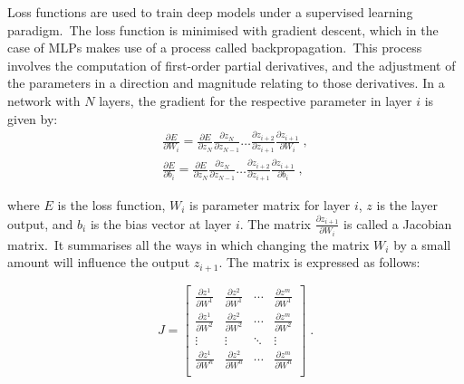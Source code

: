 \noindent Loss functions are used to train deep models under a supervised learning paradigm.\ The loss function is minimised with gradient descent, which in the case of MLPs makes use of a process called backpropagation.\ This process involves the computation of first-order partial derivatives, and the adjustment of the parameters in a direction and magnitude relating to those derivatives. In a network with $ N $ layers, the gradient for the respective parameter in layer $ i $ is given by:
\begin{subequations}
	\begin{gather}
		\frac{\partial E} {\partial W_i} = \frac{\partial E} {\partial z_N}\frac{\partial z_N} {\partial z_{N - 1}}  \dots \frac{\partial z_{i + 2}} {\partial z_{i + 1}}\frac{\partial z_{i + 1}} {\partial W_{i}} \; , \\
		\frac{\partial E} {\partial b_i} = \frac{\partial E} {\partial z_N}\frac{\partial z_N} {\partial z_{N - 1}}  \dots \frac{\partial z_{i + 2}} {\partial z_{i + 1}}\frac{\partial z_{i + 1}} {\partial b_{i}} \; ,
	\end{gather}
\end{subequations}

\noindent where $ E $ is the loss function, $ W_i $ is parameter matrix for layer $ i $, $ z $ is the layer output, and $ b_i $ is the bias vector at layer $ i $. The matrix $ \frac{\partial z_{i + 1}} {\partial W_i} $ is called a Jacobian matrix.\ It summarises all the ways in which changing the matrix $ W_i $ by a small amount will influence the output $ z_{i + 1} $. The matrix is expressed as follows: \par
\begin{equation}
	\renewcommand\arraystretch{2}
	J = \begin{bmatrix}
        		\frac{\partial z^1}{\partial W^1} & \frac{\partial z^2}{\partial W^1} & \cdots & \frac{\partial z^m}{\partial W^1} \\
           	\frac{\partial z^1}{\partial W^2} &\frac{\partial z^2}{\partial W^2} & \cdots & \frac{\partial z^m}{\partial W^2} \\
           	\vdots & \vdots & \ddots & \vdots \\
           	\frac{\partial z^1}{\partial W^n} & \frac{\partial z^2}{\partial W^n} & \cdots & \frac{\partial z^m}{\partial W^n} \\
        \end{bmatrix} \; .
\end{equation}

